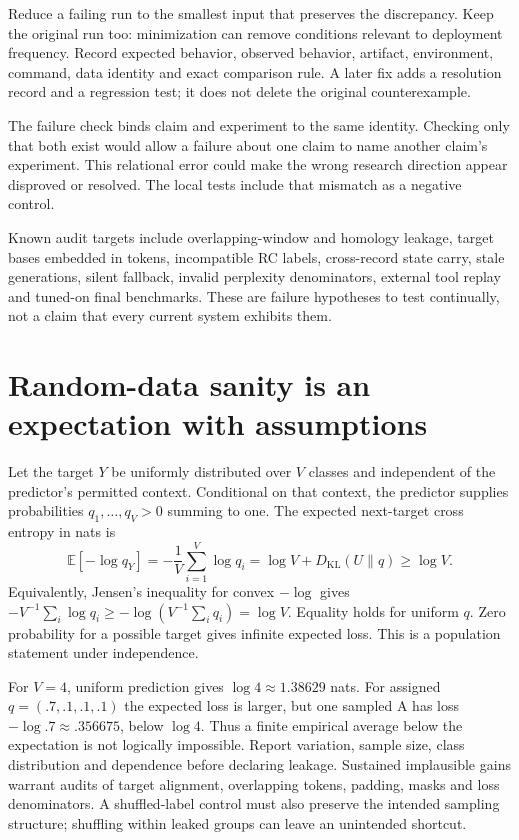 Reduce a failing run to the smallest input that preserves the discrepancy.
Keep the original run too: minimization can remove conditions relevant to
deployment frequency. Record expected behavior, observed behavior, artifact,
environment, command, data identity and exact comparison rule. A later fix adds
a resolution record and a regression test; it does not delete the original
counterexample.

The failure check binds claim and experiment to the same identity. Checking only
that both exist would allow a failure about one claim to name another claim's
experiment. This relational error could make
the wrong research direction appear disproved or resolved. The local tests
include that mismatch as a negative control.

Known audit targets include overlapping-window and homology leakage, target
bases embedded in tokens, incompatible RC labels, cross-record state carry,
stale generations, silent fallback, invalid perplexity denominators, external
tool replay and tuned-on final benchmarks. These are failure hypotheses to
test continually, not a claim that every current system exhibits them.

\section{Random-data sanity is an expectation with assumptions}
Let the target $Y$ be uniformly distributed over $V$ classes and independent
of the predictor's permitted context. Conditional on that context, the
predictor supplies probabilities $q_1,\ldots,q_V>0$ summing to one.
The expected next-target cross entropy in nats is
\begin{equation}\label{evod52:entropy}
\mathbb E[-\log q_Y]= -\frac1V\sum_{i=1}^V\log q_i
=\log V+D_{\mathrm{KL}}(U\|q)\ge\log V.
\end{equation}
Equivalently, Jensen's inequality for convex $-\log$ gives
$-V^{-1}\sum_i\log q_i\ge-\log(V^{-1}\sum_iq_i)=\log V$.
Equality holds for uniform $q$. Zero probability for a possible target gives
infinite expected loss. This is a population statement under independence.

For $V=4$, uniform prediction gives $\log4\approx1.38629$ nats.
For assigned $q=(.7,.1,.1,.1)$ the expected loss is larger, but one sampled
A has loss $-\log .7\approx.356675$, below $\log4$. Thus a finite empirical
average below the expectation is not logically impossible. Report variation,
sample size, class distribution and dependence before declaring leakage.
Sustained implausible gains warrant audits of target alignment, overlapping
tokens, padding, masks and loss denominators. A shuffled-label control must
also preserve the intended sampling structure; shuffling within leaked groups
can leave an unintended shortcut.


